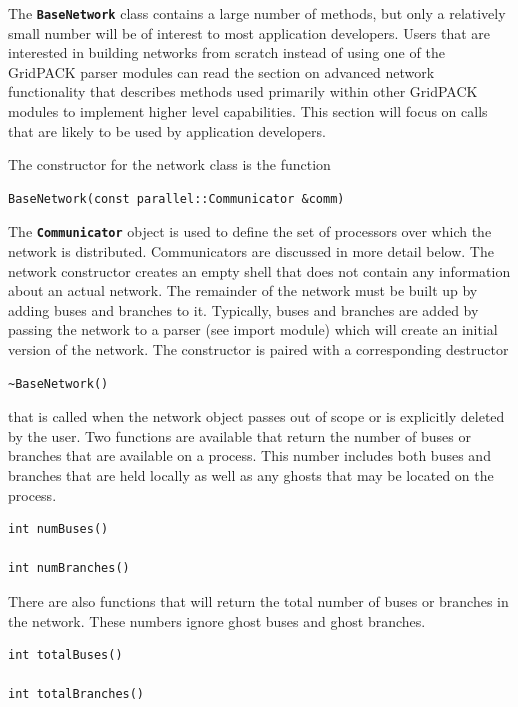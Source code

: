 \documentclass[12pt]{report} %
\begin{document}
The \texttt{\textbf{BaseNetwork}} class contains a large number of methods, but only a relatively small number will be of interest to most application developers. Users that are interested in building networks from scratch instead of using one of the GridPACK parser modules can read the section on advanced network functionality that describes methods used primarily within other GridPACK modules to implement higher level capabilities. This section will focus on calls that are likely to be used by application developers.

The constructor for the network class is the function

{
\color{red}
\begin{Verbatim}[fontseries=b]
BaseNetwork(const parallel::Communicator &comm)
\end{Verbatim}
}

The \texttt{\textbf{Communicator}} object is used to define the set of processors over which the network is distributed. Communicators are discussed in more detail below. The network constructor creates an empty shell that does not contain any information about an actual network. The remainder of the network must be built up by adding buses and branches to it. Typically, buses and branches are added by passing the network to a parser (see import module) which will create an initial version of the network. The constructor is paired with a corresponding destructor

{
\color{red}
\begin{Verbatim}[fontseries=b]
~BaseNetwork()
\end{Verbatim}
}

that is called when the network object passes out of scope or is explicitly deleted by the user.
Two functions are available that return the number of buses or branches that are available on a process. This number includes both buses and branches that are held locally as well as any ghosts that may be located on the process.

{
\color{red}
\begin{Verbatim}[fontseries=b]
int numBuses()

int numBranches()
\end{Verbatim}
}

There are also functions that will return the total number of buses or branches in the network. These numbers ignore ghost buses and ghost branches.

{
\color{red}
\begin{Verbatim}[fontseries=b]
int totalBuses()

int totalBranches()
\end{Verbatim}
}
\end{document}
